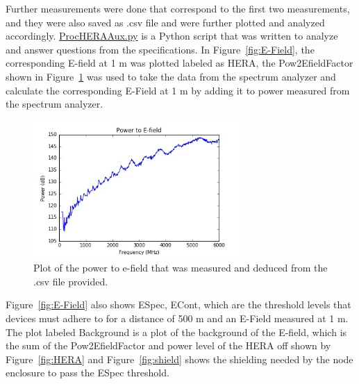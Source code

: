 \documentclass[12pt,a4paper]{report}
\begin{document}
{{			Further measurements were done that correspond to the first two measurements, and they were also saved as .csv file and were further plotted and analyzed accordingly. \href{https://github.com/Casablanca25273/Worksheet}{ProcHERAAux.py} is a Python script that was written to analyze and answer questions from the specifications. In Figure~\ref*{fig:E-Field}, the corresponding E-field at 1 m was plotted labeled as HERA, the Pow2EfieldFactor shown in Figure~\ref*{fig:powtoefield} was used to take the data from the spectrum analyzer and calculate the corresponding E-Field at 1 m by adding it to power measured from the spectrum analyzer.
			
			\begin{figure}[h!]
				\centering
				\includegraphics[width=0.7\textwidth]{powtoefield.jpeg}
				\caption{Plot of the power to e-field that was measured and deduced from the .csv file provided.}
				\label{fig:powtoefield}
			\end{figure}
			
			Figure~\ref*{fig:E-Field} also shows E\textunderscore Spec, E\textunderscore Cont, which are the threshold levels that devices must adhere to for a
			distance of 500 m and an E-Field measured at 1 m. The plot labeled Background is a plot of the background of the E-field, which is the sum of the Pow2EfieldFactor and power level of the HERA off shown by Figure~\ref*{fig:HERA} and Figure~\ref*{fig:shield} shows the shielding needed by the node enclosure to pass the E\textunderscore Spec threshold. 
			
}}
\end{document}
